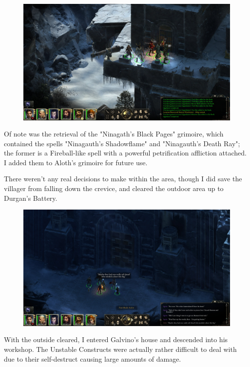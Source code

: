 \documentclass{article}
\begin{document}
\begin{figure}
\includegraphics[scale=0.33]{files/blog/2019_08_17_poe_potd_wmpt1/2019_08_17_durgans_battery_outside_1.jpg}
\end{figure}

Of note was the retrieval of the "Ninagath's Black Pages" grimoire, which contained the spells "Ninagauth's Shadowflame" and "Ninagauth's Death Ray"; the former is a Fireball-like spell with a powerful petrification affliction attached.  I added them to Aloth's grimoire for future use.

There weren't any real decisions to make within the area, though I did save the villager from falling down the crevice, and cleared the outdoor area up to Durgan's Battery.

\begin{figure}
\includegraphics[scale=0.33]{files/blog/2019_08_17_poe_potd_wmpt1/2019_08_17_durgans_battery_outside_2.jpg}
\end{figure}

With the outside cleared, I entered Galvino's house and descended into his workshop.  The Unstable Constructs were actually rather difficult to deal with due to their self-destruct causing large amounts of damage.
\end{document}
